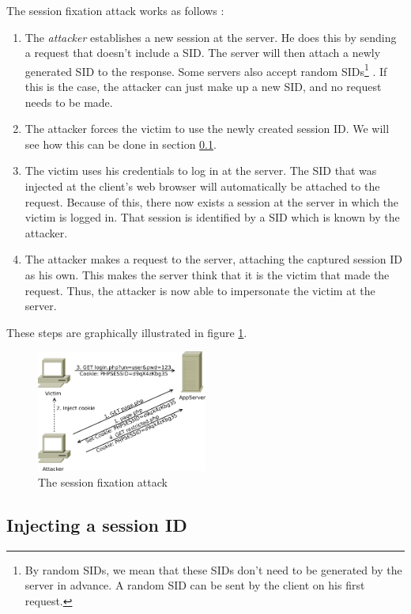 The session fixation attack works as follows \cite{Kolsek2002}:

\begin{enumerate}
	\item The \emph{attacker} establishes a new session at the server. He does this by sending a request that doesn't include a SID. The server will then attach a newly generated
SID to the response. Some servers also accept random SIDs\footnote{By random SIDs, we mean that these SIDs don't need to be generated by the server in advance. A random SID can be sent by the client on his first request.} \cite{Shiflett2004}. If this is the case, the attacker can just make up a new SID, and no request needs to be made.
	\item The attacker forces the victim to use the newly created session ID. We will see how this can be done in section \ref{injecting-sid}.
	\item The victim uses his credentials to log in at the server. The SID that was injected at the client's web browser will automatically be attached to the request. Because of this, there now exists a session at the server in which the victim is logged in. That session is identified by a SID which is known by the attacker.
	\item The attacker makes a request to the server, attaching the captured session ID as his own. This makes the server think that it is the victim that made the request. Thus, the attacker is now able to impersonate the victim at the server.
\end{enumerate}

These steps are graphically illustrated in figure \ref{fig:fixation}.

\begin{figure}[ht]
	\centering
	\includegraphics[width=0.50\textwidth]{img/fixation.png}
	\caption{The session fixation attack}
	\label{fig:fixation}
\end{figure}

\subsection{Injecting a session ID}\label{injecting-sid}

